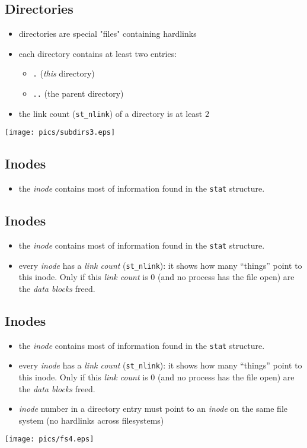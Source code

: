 \documentclass[xga]{xdvislides}
\begin{document}
\subsection{Directories}
\begin{itemize}
	\item directories are special "files" containing hardlinks
	\item each directory contains at least two entries:
		\begin{itemize}
			\item {\tt .} ({\em this} directory)
			\item {\tt ..} (the parent directory)
		\end{itemize}
	\item the link count ({\tt st\_nlink}) of a directory is at least $2$
\end{itemize}
\texttt{[image: pics/subdirs3.eps]}

\subsection{Inodes}
\begin{itemize}
	\item the {\em inode} contains most of information found in the {\tt stat}
		structure.
\end{itemize}

\subsection{Inodes}
\begin{itemize}
	\item the {\em inode} contains most of information found in the {\tt stat}
		structure.
	\item every {\em inode} has a {\em link count} ({\tt st\_nlink}):  it
		shows how many ``things'' point to this inode.  Only if this
		{\em link count} is 0 (and no process has the file open) are the
		{\em data blocks} freed.
\end{itemize}

\subsection{Inodes}
\begin{itemize}
	\item the {\em inode} contains most of information found in the {\tt stat}
		structure.
	\item every {\em inode} has a {\em link count} ({\tt st\_nlink}):  it
		shows how many ``things'' point to this inode.  Only if this
		{\em link count} is 0 (and no process has the file open) are the
		{\em data blocks} freed.
	\item {\em inode} number in a directory entry must point to an {\em inode}
		on the same file system (no hardlinks across filesystems)
\end{itemize}
\texttt{[image: pics/fs4.eps]}
\end{document}
